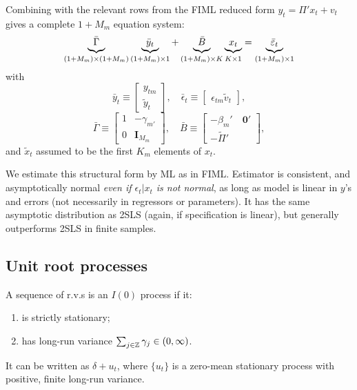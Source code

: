\documentclass[8pt,letterpaper, landscape]{extarticle} %
\newcommand{\mI}{\ensuremath{\mathbf{I}}}
\newcommand{\mzero}{\ensuremath{\mathbf{0}}}
\begin{document}
\begin{multicols}{3}
\begin{description}
Combining with the relevant rows from the FIML reduced form $ y_t = \Pi' x_t + v_t $ gives a complete $ 1 + M_m  $ equation system:
\[ \underbrace{\bar{\Gamma} \vphantom{\bar{\Gamma} \bar{y}_{t} \bar{B} x_t \bar{\epsilon}_t} }_{(1 + M_m) \times (1 + M_m)} \underbrace{\bar{y}_{t} \vphantom{\bar{\Gamma} \bar{y}_{t} \bar{B} x_t \bar{\epsilon}_t} }_{(1 + M_m) \times 1} + \underbrace{\bar{B} \vphantom{\bar{\Gamma} \bar{y}_{t} \bar{B} x_t \bar{\epsilon}_t} }_{(1 + M_m) \times K} \underbrace{x_t \vphantom{\bar{\Gamma} \bar{y}_{t} \bar{B} x_t \bar{\epsilon}_t} }_{K \times 1 \vphantom{M_m)}  } = \underbrace{\bar{\epsilon}_t \vphantom{\bar{\Gamma} \bar{y}_{t} \bar{B} x_t \bar{\epsilon}_t} }_{(1 + M_m) \times 1} \]
with
$$
\bar{y}_t \equiv \begin{bmatrix} y_{tm} \\ \tilde{y}_{t} \end{bmatrix}, \quad
\bar{\epsilon}_t \equiv \begin{bmatrix} \epsilon_{tm} \tilde{v}_t \end{bmatrix},
$$
$$
\bar{\Gamma} \equiv \begin{bmatrix} 1 & - \gamma_{m'} \\ 0 & \mI_{M_m} \end{bmatrix}, \quad
\bar{B} \equiv \begin{bmatrix} - \beta_{m}' \quad \mzero' \\ - \tilde{\Pi}' \end{bmatrix},
$$
and $ \tilde{x}_t $ assumed to be the first $ K_m $ elements of $ x_t $.

We estimate this structural form by ML as in FIML. Estimator is consistent, and asymptotically normal \textit{even if $ \epsilon_t | x_t $ is not normal}, as long as model is linear in $ y $'s and errors (not necessarily in regressors or parameters). It has the same asymptotic distribution as 2SLS (again, if specification is linear), but generally outperforms 2SLS in finite samples.

\subsection{Unit root processes}
 A sequence of r.v.s is an $ I(0) $ process if it:
\begin{enumerate}
\item is strictly stationary;
\item has long-run variance $ \sum_{j \in \mathbb{Z}} \gamma_j \in ( 0, \infty ) $.
\end{enumerate}
It can be written as $ \delta + u_t $, where $ \{ u_t \} $ is a zero-mean stationary process with positive, finite long-run variance.


\end{description}
\end{multicols}
\end{document}
